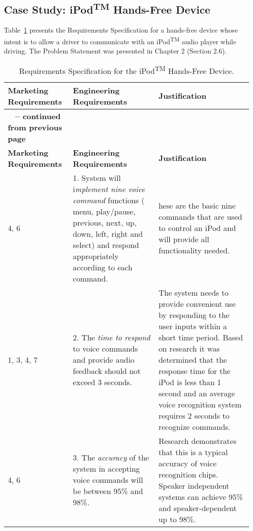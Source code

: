 \subsection{Case Study: iPod\textsuperscript{TM} Hands-Free Device}
\label{subsection:case-study-ipodtm-hands-free-device}

Table~\ref{table:ipod} presents the Requirements Specification for a hands-free
device whose intent is to allow a driver to communicate with an
iPod\textsuperscript{TM} audio player while driving. The Problem
Statement was presented in Chapter 2 (Section 2.6).



\begin{longtable}{ |p{2.5cm}|p{5cm}|p{5cm}|} 
\caption{Requirements Specification for the iPod\textsuperscript{TM} Hands-Free Device.}
\label{table:ipod}\\

\hline
\rowcolor{Gray}
\textbf{Marketing Requirements} & \textbf{Engineering Requirements} & \textbf{Justification} \\ \hline
\endfirsthead

\hline
\rowcolor{Gray}
\multicolumn{3}{|c|}
{{\bfseries \tablename\ \thetable{} -- continued from previous page}} \\ \hline
\rowcolor{Gray}
\textbf{Marketing Requirements} & \textbf{Engineering Requirements} & \textbf{Justification} \\ \hline
\endhead
\endfoot

4, 6 & 
1.  System will i\emph{mplement nine voice command} functions ( menu,
  play/pause, previous, next, up, down, left, right and select) and
  respond appropriately according to each command. &
  hese are the basic nine commands that are used to
control an iPod and will provide all functionality needed. \\ \hline

1, 3, 4, 7 & 
2.   The \emph{time to respond} to voice commands and provide audio
  feedback should not exceed 3 seconds. &
The system needs to provide convenient use by
responding to the user inputs within a short time period. Based on
research it was determined that the response time for the iPod is less
than 1 second and an average voice recognition system requires 2 seconds
to recognize commands. \\ \hline

4, 6 & 
3.   The \emph{accuracy} of the system in accepting voice commands will be
  between 95\% and 98\%. &
Research demonstrates that this is a typical accuracy
of voice recognition chips. Speaker independent systems can achieve 95\%
and speaker-dependent up to 98\%. \\ \hline


\end{longtable}
